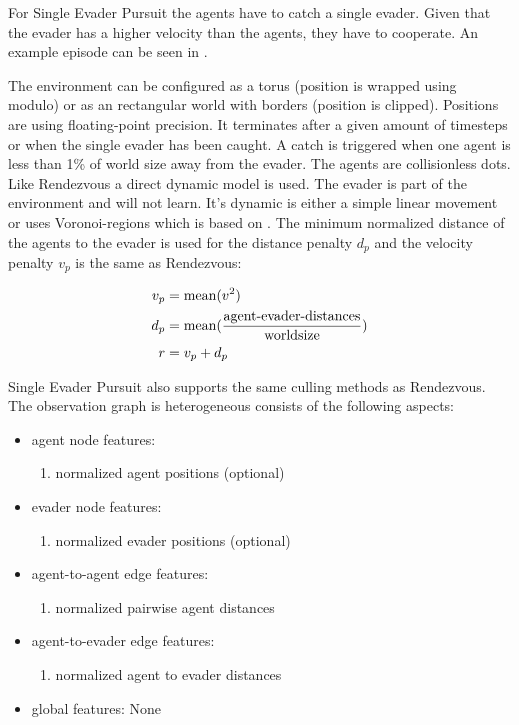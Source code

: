 For Single Evader Pursuit the agents have to catch a single evader. Given that the evader has a higher velocity than the agents, they have to cooperate. An example episode can be seen in .\par

The environment can be configured as a torus (position is wrapped using modulo) or as an rectangular world with borders (position is clipped). Positions are using floating-point precision. It terminates after a given amount of timesteps or when the single evader has been caught. A catch is triggered when one agent is less than 1\% of world size away from the evader.
The agents are collisionless dots. Like Rendezvous a direct dynamic model is used. The evader is part of the environment and will not learn. It's dynamic is either a simple linear movement or uses Voronoi-regions which is based on \citet{ZHOU201664}.
The minimum normalized distance of the agents to the evader is used for the distance penalty $d_p$ and the velocity penalty $v_p$ is the same as Rendezvous:

\begin{equation}
    \begin{aligned}
        v_p &= \textup{mean}(v^2)\\
        d_p &= \textup{mean}(\frac{\textup{agent-evader-distances}}{\textup{worldsize}}) \\
        r &= v_p + d_p
    \end{aligned}
    \nonumber
\end{equation}

Single Evader Pursuit also supports the same culling methods as Rendezvous. The observation graph is heterogeneous consists of the following aspects:
\begin{itemize}[noitemsep,nolistsep]
    \item agent node features:
    \begin{enumerate}
        \item normalized agent positions (optional)
    \end{enumerate} 
    \item evader node features:
    \begin{enumerate}
        \item normalized evader positions (optional)
    \end{enumerate}
    \item agent-to-agent edge features:
    \begin{enumerate}
        \item normalized pairwise agent distances
    \end{enumerate} 
    \item agent-to-evader edge features:
    \begin{enumerate}
        \item normalized agent to evader distances
    \end{enumerate} 
    \item global features: None
\end{itemize}



